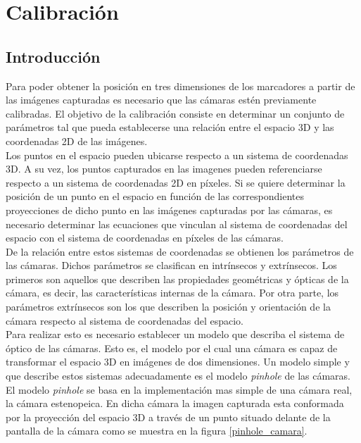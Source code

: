 


\section{Calibración}
\label{calibracion}

\subsection{Introducción}
Para poder obtener la posición en tres dimensiones de los marcadores a partir de las imágenes capturadas es necesario que las cámaras estén previamente calibradas. El objetivo de la calibración consiste en determinar un conjunto de parámetros tal que pueda establecerse una relación entre el espacio 3D y las coordenadas 2D de las imágenes.\\

Los puntos en el espacio pueden ubicarse respecto a un sistema de coordenadas 3D. A su vez, los puntos capturados en las imagenes pueden referenciarse respecto a un sistema de coordenadas 2D en píxeles. Si se quiere determinar la posición de un punto en el espacio en función de las correspondientes proyecciones de dicho punto en las imágenes capturadas por las cámaras, es necesario determinar las ecuaciones que vinculan al sistema de coordenadas del espacio con el sistema de coordenadas en píxeles de las cámaras.\\

De la relación entre estos sistemas de coordenadas se obtienen los parámetros de las cámaras. Dichos parámetros se clasifican en intrínsecos y extrínsecos. Los primeros son aquellos que describen las propiedades geométricas y ópticas de la cámara, es decir, las características internas de la cámara. Por otra parte, los parámetros extrínsecos son los que describen la posición y orientación de la cámara respecto al sistema de coordenadas del espacio.\\

Para realizar esto es necesario establecer un modelo que describa el sistema de óptico de las cámaras. Esto es, el modelo por el cual una cámara es capaz de transformar el espacio 3D en imágenes de dos dimensiones. Un modelo simple y que describe estos sistemas adecuadamente es el modelo \textit{pinhole} de las cámaras. 
El modelo \textit{pinhole} se basa en la implementación mas simple de una cámara real, la cámara estenopeica. En dicha cámara la imagen capturada esta conformada por la proyección del espacio 3D a través de un punto situado delante de la pantalla de la cámara como se muestra en la figura \ref{pinhole_camara}.


